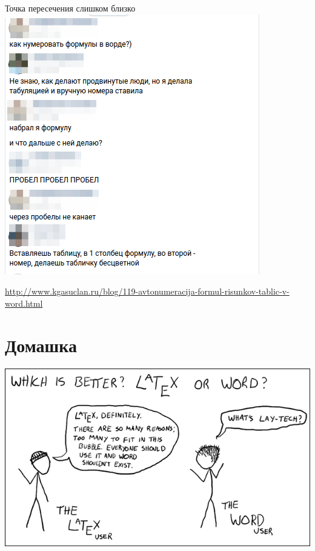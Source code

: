 \documentclass[newPxFont]{beamer}
\begin{document}
\begin{frame}{Точка пересечения слишком близко}
\centering
    \includegraphics[scale=0.48]{pain.png}


\url{http://www.kgasuclan.ru/blog/119-avtonumeracija-formul-risunkov-tablic-v-word.html}
\end{frame}


\section{Домашка} %


\begingroup
{}
\begin{frame}[plain]
\vspace{0.5cm}
\centering {}

\vspace{0.2cm}
\centering \includegraphics[width=0.8\linewidth]{joke_2.png}
\vspace{0.2cm}

\centering {}
\end{frame}
\endgroup 
\end{document}
